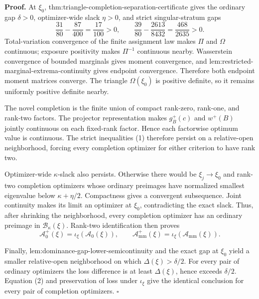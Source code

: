 \textbf{Proof.}
At \(\xi_0\), thm:triangle-completion-separation-certificate gives the ordinary gap \(\delta>0\), optimizer-wide slack \(\eta>0\), and strict singular-stratum gaps
\[
 \frac{31}{80}-\frac{87}{400}=\frac{17}{100}>0,
 \qquad
 \frac{39}{80}-\frac{2613}{8432}=\frac{468}{2635}>0. \tag{1}
\]
Total-variation convergence of the finite assignment law makes \(\Pi\) and \(\Omega\) continuous; exposure positivity makes \(\Pi^{-1}\) continuous nearby.  Wasserstein convergence of bounded marginals gives moment convergence, and lem:restricted-marginal-extrema-continuity gives endpoint convergence.  Therefore both endpoint moment matrices converge.  The triangle \(\Omega(\xi_0)\) is positive definite, so it remains uniformly positive definite nearby.

The novel completion is the finite union of compact rank-zero, rank-one, and rank-two factors.  The projector representation makes \(g_B^+(c)\) and \(w^+(B)\) jointly continuous on each fixed-rank factor.  Hence each factorwise optimum value is continuous.  The strict inequalities (1) therefore persist on a relative-open neighborhood, forcing every completion optimizer for either criterion to have rank two.

Optimizer-wide \(\kappa\)-slack also persists.  Otherwise there would be \(\xi_j\to\xi_0\) and rank-two completion optimizers whose ordinary preimages have normalized smallest eigenvalue below \(\kappa+\eta/2\).  Compactness gives a convergent subsequence.  Joint continuity makes its limit an optimizer at \(\xi_0\), contradicting the exact slack.  Thus, after shrinking the neighborhood, every completion optimizer has an ordinary preimage in \(\mathcal B_\kappa(\xi)\).  Rank-two identification then proves
\[
 \mathcal A_0^+(\xi)=\iota_\xi(\mathcal A_0(\xi)),
 \qquad
 \mathcal A_{\mathrm{mm}}^+(\xi)=\iota_\xi(\mathcal A_{\mathrm{mm}}(\xi)). \tag{2}
\]

Finally, lem:dominance-gap-lower-semicontinuity and the exact gap at \(\xi_0\) yield a smaller relative-open neighborhood on which \(\Delta(\xi)>\delta/2\).  For every pair of ordinary optimizers the loss difference is at least \(\Delta(\xi)\), hence exceeds \(\delta/2\).  Equation (2) and preservation of loss under \(\iota_\xi\) give the identical conclusion for every pair of completion optimizers. \(\square\)